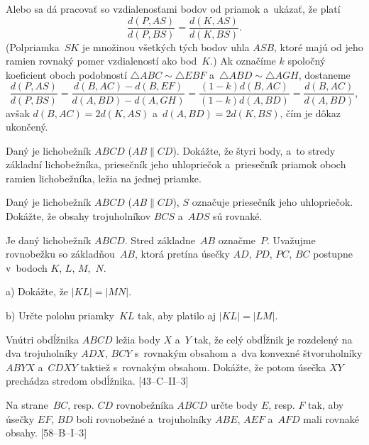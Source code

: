 {Alebo sa dá pracovať so vzdialenosťami bodov od priamok a~ukázať, že platí
$$
\frac{d(P,AS)}{d(P,BS)}=\frac{d(K,AS)}{d(K,BS)}.
$$
(Polpriamka~$SK$ je množinou všetkých tých bodov uhla $ASB$,
ktoré majú od jeho ramien rovnaký pomer vzdialeností ako bod~$K$.)
Ak označíme $k$ spoločný koeficient oboch podobností $\triangle
ABC\sim\triangle EBF$ a~$\triangle ABD\sim\triangle AGH$, dostaneme
$$
\frac{d(P,AS)}{d(P,BS)}=\frac{d(B,AC)-d(B,EF)}{d(A,BD)-d(A,GH)}=
\frac{(1-k)d(B,AC)}{(1-k)d(A,BD)}=\frac{d(B,AC)}{d(A,BD)},
$$
avšak $d(B,AC)=2d(K,AS)$ a~$d(A,BD)=2d(K,BS)$, čím je dôkaz ukončený.


Daný je lichobežník $ABCD$ ($AB\parallel CD$). Dokážte, že štyri
body, a~to stredy základní lichobežníka, priesečník jeho uhlopriečok
a~priesečník priamok oboch ramien lichobežníka, ležia na jednej
priamke.

Daný je lichobežník $ABCD$ ($AB\parallel CD$), $S$ označuje priesečník
jeho uhlopriečok. Dokážte, že obsahy trojuholníkov $BCS$ a~$ADS$ sú
rovnaké.

Je daný lichobežník $ABCD$. Stred základne~$AB$ označme~$P$.
Uvažujme rovnobežku so základňou~$AB$, ktorá pretína úsečky $AD$, $PD$, $PC$, $BC$ postupne
v~bodoch $K$, $L$, $M$,~$N$.
\item{a)} Dokážte, že $|KL| =|MN|$.
\item{b)} Určte polohu priamky~$KL$ tak, aby platilo aj $|KL|=|LM|$.\endgraf
[60--C--I--6]

Vnútri obdĺžnika $ABCD$ ležia body $X$ a~$Y$ tak, že celý obdĺžnik je
rozdelený na dva trojuholníky $ADX$, $BCY$ s~rovnakým obsahom a~dva konvexné
štvoruholníky $ABYX$ a~$CDXY$ taktiež s~rovnakým obsahom. Dokážte, že potom
úsečka $XY$ prechádza stredom obdĺžnika. [43--C--II--3]

Na strane~$BC$, resp. $CD$ rovnobežníka $ABCD$ určte body $E$,
resp. $F$ tak, aby úsečky $EF$, $BD$ boli rovnobežné a~trojuholníky $ABE$,
$AEF$ a~$AFD$ mali rovnaké obsahy.
[\hbox{58--B--I--3}]
}

